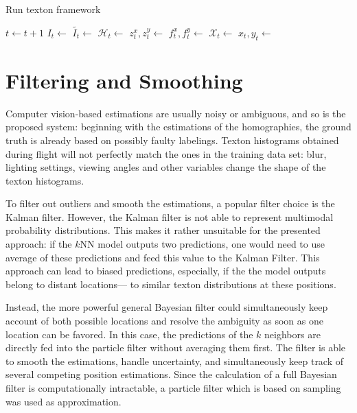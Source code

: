 \begin{algorithm}
\caption{{Run texton framework}}
\label{alg:trexton_run}
  \begin{algorithmic}[1]
    \State $t \gets t+1$ 
    \State $I_t \gets$ 
    \State $\widetilde{I_t} \gets$ 
    \State $\mathcal{H}_t \gets$ 
    \State $z_t^x, z_t^y \gets$ 
    \State $f_t^x, f_t^y \gets$ 
    \State $\mathcal{X}_t \gets$
    \State $x_t, y_t \gets$ 
    \State {}
    \EndProcedure
  \end{algorithmic}
\end{algorithm}


\section{Filtering and Smoothing}
\label{sec:filtering}


Computer vision-based estimations are usually noisy or ambiguous, and
so is the proposed system: beginning with the estimations of the
homographies, the ground truth is already based on possibly faulty
labelings. Texton histograms obtained during flight will not perfectly
match the ones in the training data set: blur, lighting settings,
viewing angles and other variables change the shape of the texton
histograms.

To filter out outliers and smooth the estimations, a popular filter
choice is the Kalman filter. However, the Kalman filter is not able to
represent multimodal probability distributions. This makes it rather
unsuitable for the presented approach: if the $k$NN model outputs two
predictions, one would need to use average of these predictions and
feed this value to the Kalman Filter. This approach can lead to biased
predictions, especially, if the the model outputs belong to distant
locations--- to similar texton distributions at these positions.

Instead, the more powerful general Bayesian filter could simultaneously keep
account of both possible locations and resolve the ambiguity as soon
as one location can be favored. In this case, the predictions of the
$k$ neighbors are directly fed into the particle filter without
averaging them first. The filter is able to smooth the estimations,
handle uncertainty, and simultaneously keep track of several competing
position estimations. Since the calculation of a full Bayesian filter is computationally intractable, a particle filter which is based on sampling was used as approximation. 

